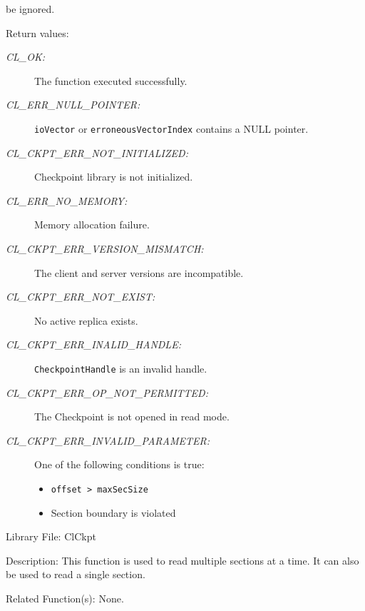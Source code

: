 \begin{flushleft}
\begin{Desc}
\begin{description}
be ignored.\end{description}
\end{Desc}
\begin{Desc}
\item[Return values:]
\begin{description}
\item[{\em CL\_\-OK:}]The function executed successfully. 
\item[{\em CL\_\-ERR\_\-NULL\_\-POINTER:}]{\tt{ioVector}} or {\tt{erroneousVectorIndex}} contains a NULL pointer. 
\item[{\em CL\_\-CKPT\_\-ERR\_\-NOT\_\-INITIALIZED:}]Checkpoint library is not initialized. 
\item[{\em CL\_\-ERR\_\-NO\_\-MEMORY:}]Memory allocation failure.
\item[{\em CL\_\-CKPT\_\-ERR\_\-VERSION\_\-MISMATCH:}]The client and server versions are incompatible.
\item[{\em CL\_\-CKPT\_\-ERR\_\-NOT\_\-EXIST:}] No active replica exists.
\item[{\em CL\_\-CKPT\_\-ERR\_\-INALID\_\-HANDLE:}]{\tt{CheckpointHandle}} is an invalid handle.
\item[{\em CL\_\-CKPT\_\-ERR\_\-OP\_\-NOT\_\-PERMITTED:}] The Checkpoint is not opened in read mode.
\item[{\em CL\_\-CKPT\_\-ERR\_\-INVALID\_\-PARAMETER:}]One of the following conditions is true:
\begin{itemize}
\item
{\tt{offset > maxSecSize}}
\item
Section boundary is violated
\end{itemize}
\end{description}
\end{Desc}
\begin{Desc}
\item[Library File:]Cl\-Ckpt\end{Desc}
\begin{Desc}
\item[Description:]This function is used to read multiple sections at a time. It can also be used to read a single section.\end{Desc}
\begin{Desc}
\item[Related Function(s):]None. \end{Desc}
\newpage



\end{flushleft}
